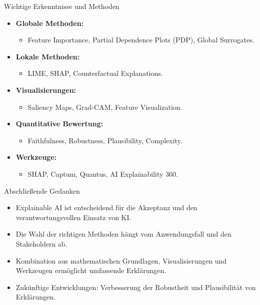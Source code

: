 \documentclass[aspectratio=1610, xcolor=dvipsnames, 9pt]{beamer}
\begin{document}
\begin{frame}{Wichtige Erkenntnisse und Methoden}
  \begin{itemize}
    \item \textbf{Globale Methoden:}
    \begin{itemize}
      \item Feature Importance, Partial Dependence Plots (PDP), Global Surrogates.
    \end{itemize}
    \item \textbf{Lokale Methoden:}
    \begin{itemize}
      \item LIME, SHAP, Counterfactual Explanations.
    \end{itemize}
    \item \textbf{Visualisierungen:}
    \begin{itemize}
      \item Saliency Maps, Grad-CAM, Feature Visualization.
    \end{itemize}
    \item \textbf{Quantitative Bewertung:}
    \begin{itemize}
      \item Faithfulness, Robustness, Plausibility, Complexity.
    \end{itemize}
    \item \textbf{Werkzeuge:}
    \begin{itemize}
      \item SHAP, Captum, Quantus, AI Explainability 360.
    \end{itemize}
  \end{itemize}
\end{frame}

\begin{frame}{Abschließende Gedanken}
  \begin{itemize}
    \item Explainable AI ist entscheidend für die Akzeptanz und den verantwortungsvollen Einsatz von KI.
    \item Die Wahl der richtigen Methoden hängt vom Anwendungsfall und den Stakeholdern ab.
    \item Kombination aus mathematischen Grundlagen, Visualisierungen und Werkzeugen ermöglicht umfassende Erklärungen.
    \item Zukünftige Entwicklungen: Verbesserung der Robustheit und Plausibilität von Erklärungen.
  \end{itemize}
\end{frame}
\end{document}
